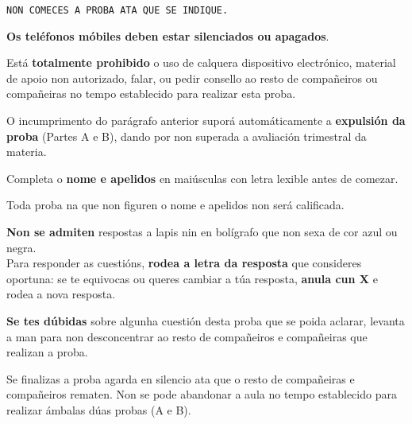 \begin{instruccions}

    \par
    \vspace*{0.15cm}
    \begin{center}
    \texttt{NON COMECES A PROBA ATA QUE SE INDIQUE.}
    \end{center}
    \begin{center}
    \textbf{Os teléfonos móbiles deben estar silenciados ou apagados}.
    \end{center}
    Está \textbf{totalmente prohibido} o uso de calquera dispositivo electrónico, material de apoio non autorizado, falar, ou pedir consello ao resto de compañeiros ou compañeiras no tempo establecido para realizar esta proba.
    \par
    \vspace*{0.2cm}
    O incumprimento do parágrafo anterior suporá automáticamente a \textbf{expulsión da proba} (Partes A e B), dando por non superada a avaliación trimestral da materia. 
    \par
    \vspace*{0.2cm}
    Completa o \textbf{nome e apelidos} en maiúsculas con letra lexible antes de comezar.
    \par
    Toda proba na que non figuren o nome e apelidos non será calificada.
    \par
    \vspace*{0.15cm}
    \textbf{Non se admiten} respostas a lapis nin en bolígrafo que non sexa de cor azul ou negra.\\
    Para responder as cuestións, \textbf{rodea a letra da resposta} que consideres oportuna: se te equivocas ou queres cambiar a túa resposta, \textbf{anula cun X} e rodea a nova resposta.
    \par
    \vspace*{0.3cm}
    \textbf{Se tes dúbidas} sobre algunha cuestión desta proba que se poida aclarar, levanta a man para non desconcentrar ao resto de compañeiros e compañeiras que realizan a proba.
    \par
    \vspace*{0.20cm}
    Se finalizas a proba agarda en silencio ata que o resto de compañeiras e compañeiros rematen. Non se pode abandonar a aula no tempo establecido para realizar ámbalas dúas probas (A e B).

\end{instruccions}
